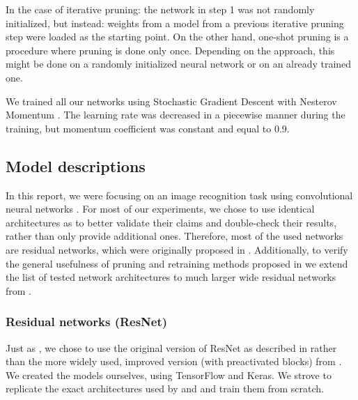 In the case of iterative pruning: the network in step 1 was not randomly initialized, but instead: weights from a model from a previous iterative pruning step were loaded as the starting point.
On the other hand, one-shot pruning is a procedure where pruning is done only once.
Depending on the approach, this might be done on a randomly initialized neural network or on an already trained one.

We trained all our networks using Stochastic Gradient Descent with Nesterov Momentum \cite{nesterov}. The learning rate was decreased in a piecewise manner during the training, but momentum coefficient was constant and equal to $0.9$.

\subsection{Model descriptions}

In this report, we were focusing on an image recognition task using convolutional neural networks \cite{lecun_convnet}. 
For most of our experiments, we chose to use identical architectures as \cite{Renda} to better validate their claims and double-check their results, rather than only provide additional ones.
Therefore, most of the used networks are residual networks, which were originally proposed in \cite{resnet}.
Additionally, to verify the general usefulness of pruning and retraining methods proposed in \cite{Renda} we extend the list of tested network architectures to much larger wide residual networks from \cite{wrn}.

\subsubsection{Residual networks (ResNet)}

Just as \cite{Renda}, we chose to use the original version of ResNet as described in \cite{resnet} rather than the more widely used, improved version (with preactivated blocks) from \cite{resnetv2}. We created the models ourselves, using TensorFlow \cite{tensorflow} and Keras. We strove to replicate the exact architectures used by \cite{Renda} and \cite{resnet} and train them from scratch.

